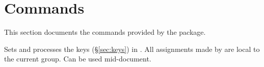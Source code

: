 \documentclass{beerydoc}
\begin{document}
\section{Commands}
\label{sec:cmds}

This section documents the commands provided by the  package.

\begin{codedoc}{\clockdatesetup}
  \begin{syntax}
     
  \end{syntax}
  Sets and processes the  keys (\S\ref{sec:keys}) in
  .
  All assignments made by  are local to the current group.
  Can be used mid-document.
\end{codedoc}
\end{document}
